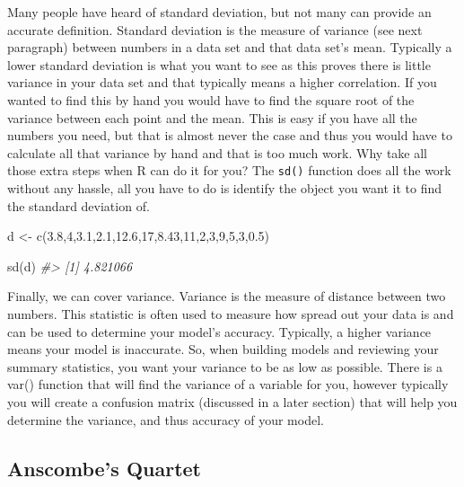 \documentclass[
]{book}
\newenvironment{Shaded}{\begin{snugshade}}{\end{snugshade}}
\newcommand{\CommentTok}[1]{\textcolor[rgb]{0.56,0.35,0.01}{\textit{#1}}}
\newcommand{\DecValTok}[1]{\textcolor[rgb]{0.00,0.00,0.81}{#1}}
\newcommand{\FloatTok}[1]{\textcolor[rgb]{0.00,0.00,0.81}{#1}}
\newcommand{\FunctionTok}[1]{\textcolor[rgb]{0.00,0.00,0.00}{#1}}
\newcommand{\NormalTok}[1]{#1}
\newcommand{\OtherTok}[1]{\textcolor[rgb]{0.56,0.35,0.01}{#1}}
\begin{document}
Many people have heard of standard deviation, but not many can provide an accurate definition. Standard deviation is the measure of variance (see next paragraph) between numbers in a data set and that data set's mean. Typically a lower standard deviation is what you want to see as this proves there is little variance in your data set and that typically means a higher correlation. If you wanted to find this by hand you would have to find the square root of the variance between each point and the mean. This is easy if you have all the numbers you need, but that is almost never the case and thus you would have to calculate all that variance by hand and that is too much work. Why take all those extra steps when R can do it for you? The \texttt{sd()} function does all the work without any hassle, all you have to do is identify the object you want it to find the standard deviation of.

\begin{Shaded}
\begin{Highlighting}[]
\NormalTok{d }\OtherTok{\textless{}{-}} \FunctionTok{c}\NormalTok{(}\FloatTok{3.8}\NormalTok{,}\DecValTok{4}\NormalTok{,}\FloatTok{3.1}\NormalTok{,}\FloatTok{2.1}\NormalTok{,}\FloatTok{12.6}\NormalTok{,}\DecValTok{17}\NormalTok{,}\FloatTok{8.43}\NormalTok{,}\DecValTok{11}\NormalTok{,}\DecValTok{2}\NormalTok{,}\DecValTok{3}\NormalTok{,}\DecValTok{9}\NormalTok{,}\DecValTok{5}\NormalTok{,}\DecValTok{3}\NormalTok{,}\FloatTok{0.5}\NormalTok{)}

\FunctionTok{sd}\NormalTok{(d)}
\CommentTok{\#\textgreater{} [1] 4.821066}
\end{Highlighting}
\end{Shaded}

Finally, we can cover variance. Variance is the measure of distance between two numbers. This statistic is often used to measure how spread out your data is and can be used to determine your model's accuracy. Typically, a higher variance means your model is inaccurate. So, when building models and reviewing your summary statistics, you want your variance to be as low as possible. There is a var() function that will find the variance of a variable for you, however typically you will create a confusion matrix (discussed in a later section) that will help you determine the variance, and thus accuracy of your model.

\hypertarget{anscombes-quartet}{%
\subsection{Anscombe's Quartet}\label{anscombes-quartet}}
\end{document}
